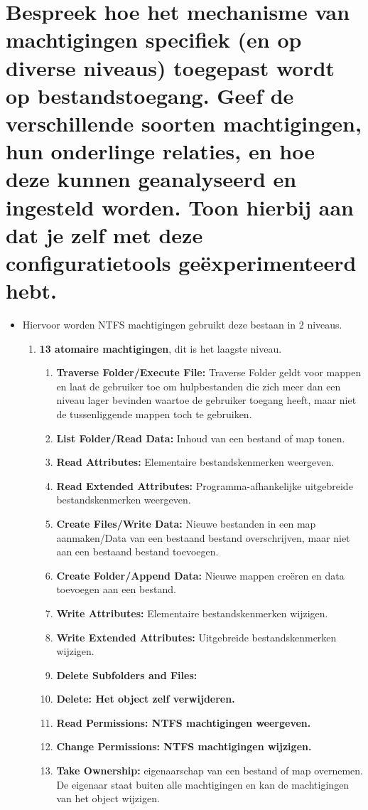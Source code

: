 \section{Bespreek hoe het mechanisme van machtigingen specifiek (en op diverse niveaus) toegepast wordt op bestandstoegang. Geef de verschillende soorten machtigingen, hun onderlinge relaties, en hoe deze kunnen geanalyseerd en ingesteld worden. Toon hierbij aan dat je zelf met deze configuratietools ge\"experimenteerd hebt.}
\begin{itemize}
\item Hiervoor worden NTFS machtigingen gebruikt deze bestaan in 2 niveaus.
\begin{enumerate}
\item \textbf{13 atomaire machtigingen}, dit is het laagste niveau.
\begin{enumerate}
\item \textbf{Traverse Folder/Execute File:} Traverse Folder geldt voor mappen en laat de gebruiker toe om hulpbestanden die zich meer dan een niveau lager bevinden waartoe de gebruiker toegang heeft, maar niet de tussenliggende mappen toch te gebruiken.
\item \textbf{List Folder/Read Data:} Inhoud van een bestand of map tonen.
\item \textbf{Read Attributes:} Elementaire bestandskenmerken weergeven.
\item \textbf{Read Extended Attributes:} Programma-afhankelijke uitgebreide bestandskenmerken weergeven.
\item \textbf{Create Files/Write Data:} Nieuwe bestanden in een map aanmaken/Data van een bestaand bestand overschrijven, maar niet aan een bestaand bestand toevoegen.
\item \textbf{Create Folder/Append Data:} Nieuwe mappen creëren en data toevoegen aan een bestand.
\item \textbf{Write Attributes:} Elementaire bestandskenmerken wijzigen.
\item \textbf{Write Extended Attributes:} Uitgebreide bestandskenmerken wijzigen.
\item \textbf{Delete Subfolders and Files:}
\item \textbf{Delete: Het object zelf verwijderen.}
\item \textbf{Read Permissions: NTFS machtigingen weergeven.}
\item \textbf{Change Permissions: NTFS machtigingen wijzigen.}
\item \textbf{Take Ownership:} eigenaarschap van een bestand of map overnemen. De eigenaar staat buiten alle machtigingen en kan de machtigingen van het object wijzigen.
\end{enumerate}


\end{enumerate}
\end{itemize}
